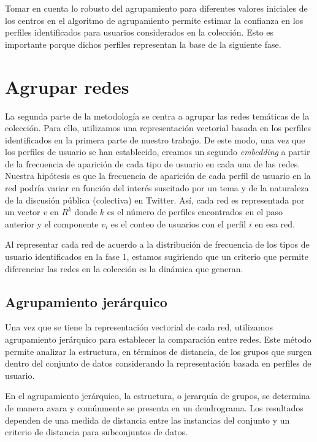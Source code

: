 Tomar en cuenta lo robusto del agrupamiento para diferentes valores iniciales de los centros en el algoritmo de agrupamiento permite estimar la confianza en los perfiles identificados para usuarios considerados en la colección. Esto es importante porque dichos perfiles representan la base de la siguiente fase. 

\section{Agrupar redes} \label{sec:system:sec3}
La segunda parte de la metodología se centra a agrupar las redes temáticas de la colección. Para ello, utilizamos una representación vectorial basada en los perfiles identificados en la primera parte de nuestro trabajo. De este modo, una vez que los perfiles de usuario se han establecido, creamos un segundo \textit{embedding} a partir de la frecuencia de aparición de cada tipo de usuario en cada una de las redes. 
Nuestra hipótesis es que la frecuencia de aparición de cada perfil de usuario en la red podría variar en función del interés suscitado por un tema y de la naturaleza de la discusión pública (colectiva) en Twitter. Así, cada red es representada por un vector $v$ en ${R}^k$ donde $k$ es el número de perfiles encontrados en el paso anterior y el componente $v_i$ es el conteo de usuarios con el perfil $i$ en esa red. 

Al representar cada red de acuerdo a la distribución de frecuencia de los tipos de usuario identificados en la fase 1, estamos sugiriendo que un criterio que permite diferenciar las redes en la colección es la dinámica que generan. 

\subsection{Agrupamiento jerárquico}
Una vez que se tiene la representación vectorial de cada red, utilizamos agrupamiento jerárquico para establecer la comparación entre redes. Este método permite analizar la estructura, en términos de distancia, de los grupos que surgen dentro del conjunto de datos considerando la representación basada en perfiles de usuario. 

En el agrupamiento jerárquico, la estructura, o jerarquía de grupos, se determina de manera avara y comúnmente se presenta en un dendrograma. Los resultados dependen de una medida de distancia entre las instancias del conjunto y un criterio de distancia para subconjuntos de datos. 

